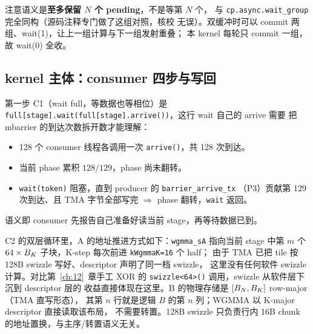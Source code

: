 注意语义是\textbf{至多保留 $N$ 个 pending}，不是等第 $N$ 个，
与 \texttt{cp.\allowbreak{}async.\allowbreak{}wait\_\allowbreak{}group} 完全同构（源码注释专门做了这组对照，核校
无误）。双缓冲时可以 commit 两组、wait(1)，让上一组计算与下一组发射重叠；
本 kernel 每轮只 commit 一组，故 wait(0) 全收。

\subsection{kernel 主体：consumer 四步与写回}

第一步 C1（wait full，等数据也等相位）是
\texttt{full[stage].wait(full[stage].arrive())}，这行 wait 自己的 arrive 需要
把 mbarrier 的到达次数拆开数才能理解：
\begin{itemize}
  \item 128 个 consumer 线程各调用一次 \texttt{arrive()}，共 128 次到达。
  \item 当前 phase 累积 $128/129$，phase 尚未翻转。
  \item \texttt{wait(token)} 阻塞，直到 producer 的 \texttt{barrier\_arrive\_tx}
        （P3）贡献第 129 次到达、且 TMA 字节全部写完 $\Rightarrow$ phase
        翻转，\texttt{wait} 返回。
\end{itemize}

语义即 consumer 先报告自己准备好读当前 stage，再等待数据已到。



C2 的双层循环里，A 的地址推进方式如下：\texttt{wgmma\_sA} 指向当前 stage 中第
$m$ 个 $64 \times B\sb{K}$ 子块，K-step 每次前进 \texttt{kWgmmaK=16} 个 half；
由于 TMA 已把 tile 按 128B swizzle 写好、descriptor 声明了同一档 swizzle，
这里没有任何软件 swizzle 计算。对比第~\ref{ch:12}~章手工 XOR 的
\texttt{swizzle\allowbreak{}<64>\allowbreak{}()} 调用，swizzle 从软件层下沉到 descriptor 层的
收益直接体现在这里。B 的物理存储是 $[B\sb{N}, B\sb{K}]$ row-major（TMA 直写形态），
其第 $n$ 行就是逻辑 $B$ 的第 $n$ 列；WGMMA 以 K-major descriptor 直接读取该布局，
不需要转置。128B swizzle 只负责行内 16B chunk 的地址置换，与主序/转置语义无关。





